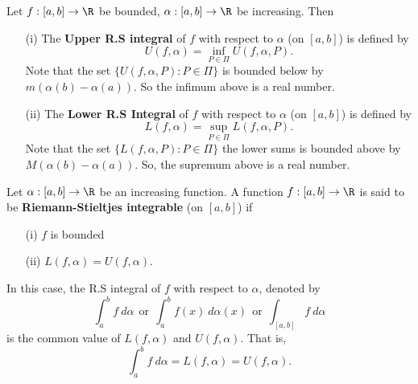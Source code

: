 \begin{definition}
    Let \( f: [a,b] \to \R  \) be bounded, \( \alpha: [a,b] \to \R  \) be increasing. Then 
    \begin{enumerate}
        \item[(i)] The \textbf{Upper R.S integral} of \( f  \) with respect to \( \alpha \) (on \( [a,b] \)) is defined by 
            \[  U(f,\alpha) = \inf_{P \in \Pi} U(f,\alpha, P).   \]
            Note that the set \( \{  U(f,\alpha, P) : P \in \Pi \}   \) is bounded below by \( m (\alpha(b) - \alpha(a)) \). So the infimum above is a real number. 
        \item[(ii)] The \textbf{Lower R.S Integral} of \( f  \) with respect to \( \alpha \) (on \( [a,b] \)) is defined by
            \[  L(f,\alpha) = \sup_{P \in \Pi} L(f,\alpha, P ). \]
            Note that the set \( \{  L(f,\alpha, P ) : P \in \Pi \} \)
            the lower sums is bounded above by \( M(\alpha(b) - \alpha(a)) \). So, the supremum above is a real number.
    \end{enumerate}
\end{definition}

\begin{definition}\label{The definition of Riemann-Stieltjes integral}
    Let \( \alpha : [a,b] \to \R  \) be an increasing function. A function \( f: [a,b] \to \R  \) is said to be \textbf{Riemann-Stieltjes integrable} (on \( [a,b] \)) if 
    \begin{enumerate}
        \item[(i)] \( f \) is bounded
        \item[(ii)] \( L(f,\alpha) = U(f,\alpha) \).
    \end{enumerate}
    In this case, the R.S integral of \( f  \) with respect to \( \alpha \), denoted by
    \[ \int_{ a }^{ b }  f  \ d \alpha \ \ \text{or} \ \ \int_{ a }^{ b }  f(x)  \ d \alpha(x) \ \ \text{or} \ \ \int_{ [a,b] } f   \ d \alpha  \]
    is the common value of \( L(f,\alpha) \) and \( U(f,\alpha) \). That is, 
    \[  \int_{ a }^{ b }  f  \ d \alpha = L (f,\alpha) = U(f,\alpha). \]
\end{definition}






